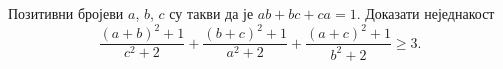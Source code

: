 Позитивни бројеви $a$, $b$, $c$ су такви да је $a b + b c + c a = 1$.
Доказати неједнакост
\[
    \frac{(a + b)^2 + 1}{c^2 + 2}
    +
    \frac{(b + c)^2 + 1}{a^2 + 2}
    +
    \frac{(a + c)^2 + 1}{b^2 + 2}
\geq
    3
.\]

\solution

